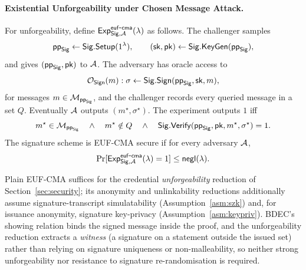 \begin{definition}
\paragraph{Existential Unforgeability under Chosen Message Attack.}
For unforgeability, define $\mathsf{Exp}^{\mathsf{euf\mbox{-}cma}}_{\mathsf{Sig},\mathcal{A}}(\lambda)$ as follows. The challenger samples
\begin{equation*}
  \mathsf{pp}_{\mathsf{Sig}}\leftarrow\mathsf{Sig}.\mathsf{Setup}(1^\lambda),
  \qquad
  (\mathsf{sk},\mathsf{pk})\leftarrow\mathsf{Sig}.\mathsf{KeyGen}(\mathsf{pp}_{\mathsf{Sig}}),
\end{equation*}
and gives $(\mathsf{pp}_{\mathsf{Sig}},\mathsf{pk})$ to $\mathcal{A}$. The adversary has oracle access to
\begin{equation*}
  \mathcal O_{\mathsf{Sign}}(m):
  \sigma\leftarrow\mathsf{Sig}.\mathsf{Sign}(\mathsf{pp}_{\mathsf{Sig}},\mathsf{sk},m),
\end{equation*}
for messages $m\in\mathcal{M}_{\mathsf{pp}_{\mathsf{Sig}}}$, and the challenger records every queried message in a set $Q$. Eventually $\mathcal{A}$ outputs $(m^\star,\sigma^\star)$. The experiment outputs $1$ iff
\begin{equation*}
  m^\star\in\mathcal{M}_{\mathsf{pp}_{\mathsf{Sig}}}
  \quad\land\quad
  m^\star\notin Q
  \quad\land\quad
  \mathsf{Sig}.\mathsf{Verify}(\mathsf{pp}_{\mathsf{Sig}},\mathsf{pk},m^\star,\sigma^\star)=1.
\end{equation*}
The signature scheme is EUF-CMA secure if for every adversary $\mathcal{A}$,
\begin{equation*}
  \Pr[\mathsf{Exp}^{\mathsf{euf\mbox{-}cma}}_{\mathsf{Sig},\mathcal{A}}(\lambda)=1]\leq \mathsf{negl}(\lambda).
\end{equation*}
\end{definition}

Plain EUF-CMA suffices for the credential \emph{unforgeability} reduction of Section~\ref{sec:security}; its anonymity and unlinkability reductions additionally assume signature-transcript simulatability (Assumption~\ref{asm:szk}) and, for issuance anonymity, signature key-privacy (Assumption~\ref{asm:keypriv}). BDEC's showing relation binds the signed message inside the proof, and the unforgeability reduction extracts a \emph{witness} (a signature on a statement outside the issued set) rather than relying on signature uniqueness or non-malleability, so neither strong unforgeability nor resistance to signature re-randomisation is required.

